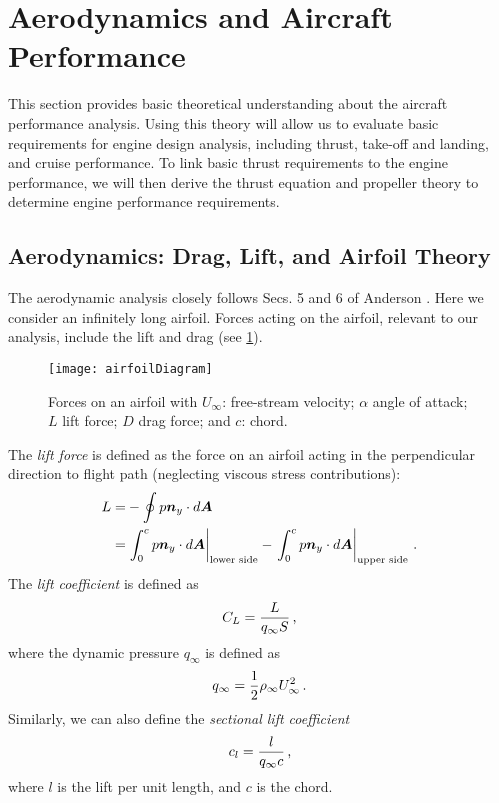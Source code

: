 \section{Aerodynamics and Aircraft Performance}
This section provides basic theoretical understanding about the aircraft performance analysis. Using this theory will allow us to evaluate basic requirements for engine design analysis, including thrust, take-off and landing, and cruise performance. To link basic thrust requirements to the engine performance, we will then derive the thrust equation and propeller theory to determine engine performance requirements. 

\subsection{Aerodynamics: Drag, Lift, and Airfoil Theory}
The aerodynamic analysis closely follows Secs. 5 and 6 of Anderson \cite{ANDERSON_INTRO_TO_FLIGHT_BOOK2012}. Here we consider an infinitely long airfoil. Forces acting on the airfoil, relevant to our analysis, include the lift and drag (see \cref{FIG_AIRFOIL}). 

\begin{figure}[!h!]
\begin{center}
  \texttt{[image: airfoilDiagram]}
  \caption{\label{FIG_AIRFOIL}Forces on an airfoil with $U_\infty$: free-stream velocity; $\alpha$ angle of attack; $L$ lift force; $D$ drag force; and $c$: chord.}
\end{center}
\end{figure}

The {\it lift force} is defined as the force on an airfoil acting in the perpendicular direction to flight path (neglecting viscous stress contributions):
\begin{equation}
  \begin{split}
    L =& - \oint p{\mbox{\boldmath$n$}}_y\cdot d {\mbox{\boldmath$A$}}\\
     =& \left.\int^c_0 p {\mbox{\boldmath$n$}}_y\cdot d {\mbox{\boldmath$A$}}\right|_\text{lower side} - \left.\int^c_0 p {\mbox{\boldmath$n$}}_y\cdot d {\mbox{\boldmath$A$}}\right|_\text{upper side} \, \text{.}
  \end{split}
\end{equation}
The {\it{lift coefficient}} is defined as
\begin{equation}
  C_L = {\frac{L}{q_\infty S}} \, \text{,}
\end{equation}
where the dynamic pressure $q_\infty$ is defined as
\begin{equation}
   q_\infty = {\frac{1}{2}}\rho_\infty U^2_\infty \, \text{.}
\end{equation}
Similarly, we can also define the {\it sectional lift coefficient}
\begin{equation}
  c_l = {\frac{l}{q_\infty c}} \, \text{,}
\end{equation}
where $l$ is the lift per unit length, and $c$ is the chord.

